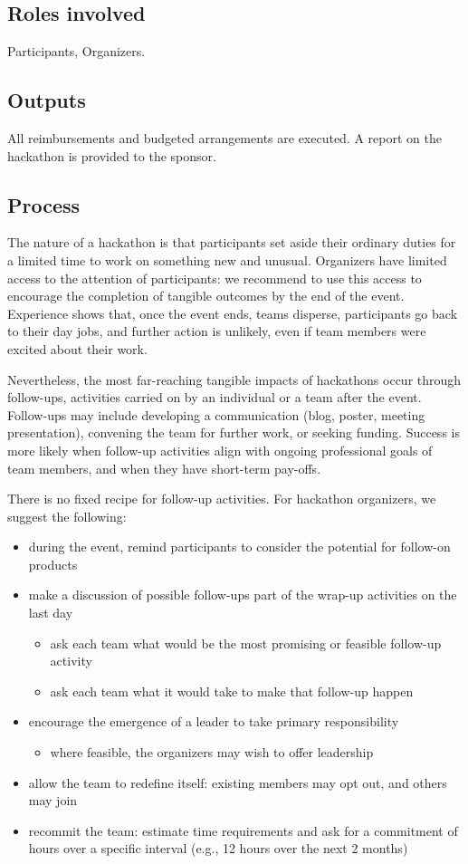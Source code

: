 \documentclass[letterpaper,11pt]{texMemo}
\begin{document}
\subsection{Roles involved}
Participants, Organizers. 
\subsection{Outputs}
All reimbursements and budgeted arrangements are executed. A report on the hackathon is provided to the sponsor.  
\subsection{Process}
The nature of a hackathon is that participants set aside their ordinary duties for a limited time to work on something new and unusual.  Organizers have limited access to the attention of participants: we recommend to use this access to encourage the completion of tangible outcomes by the end of the event.  Experience shows that, once the event ends, teams disperse, participants go back to their day jobs, and further action is unlikely, even if team members were excited about their work.   

Nevertheless, the most far-reaching tangible impacts of hackathons occur through follow-ups, activities carried on by an individual or a team after the event.  Follow-ups may include developing a communication (blog, poster, meeting presentation), convening the team for further work, or seeking funding.  Success is more likely when follow-up activities align with ongoing professional goals of team members, and when they have short-term pay-offs.  

There is no fixed recipe for follow-up activities.  For hackathon organizers, we suggest the following: 
\begin{itemize}
\item during the event, remind participants to consider the potential for follow-on products
\item make a discussion of possible follow-ups part of the wrap-up activities on the last day
\begin{itemize}
\item  ask each team what would be the most promising or feasible follow-up activity
\item  ask each team what it would take to make that follow-up happen
\end{itemize}
\item  encourage the emergence of a leader to take primary responsibility
\begin{itemize}
\item  where feasible, the organizers may wish to offer leadership
\end{itemize}
\item  allow the team to redefine itself: existing members may opt out, and others may join
\item  recommit the team: estimate time requirements and ask for a commitment of hours over a specific interval (e.g., 12 hours over the next 2 months)
\end{itemize}
\end{document}
